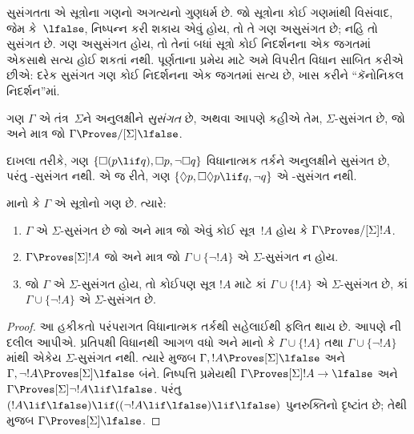 \begingroup
\makeatletter{}\makeatother


\label{guunit:OLP-0440}


સુસંગતતા એ સૂત્રોના ગણનો અગત્યનો ગુણધર્મ છે. જો સૂત્રોના કોઈ ગણમાંથી
વિસંવાદ, જેમ કે~$\lfalse$, નિષ્પન્ન કરી શકાય એવું હોય, તો તે ગણ અસુસંગત છે;
નહિ તો સુસંગત છે. ગણ અસુસંગત હોય, તો તેનાં બધાં સૂત્રો કોઈ
નિદર્શનના એક જગતમાં એકસાથે સત્ય હોઈ શકતાં નથી. પૂર્ણતાના પ્રમેય માટે
અમે વિપરીત વિધાન સાબિત કરીએ છીએ: દરેક સુસંગત ગણ કોઈ નિદર્શનના એક
જગતમાં સત્ય છે, ખાસ કરીને ``કૅનોનિકલ નિદર્શન''માં.

\begin{defn}
  ગણ $\Gamma$ એ તંત્ર~$\Sigma$ને અનુલક્ષીને \emph{સુસંગત} છે, અથવા
  આપણે કહીએ તેમ, $\Sigma$-સુસંગત છે, જો અને માત્ર જો $\Gamma
  \Proves/[\Sigma] \lfalse$.
\end{defn}

દાખલા તરીકે, ગણ $\{ \Box(p \lif q), \Box p, \lnot\Box q \}$
વિધાનાત્મક તર્કને અનુલક્ષીને સુસંગત છે, પરંતુ -સુસંગત નથી.
એ જ રીતે, ગણ $\{ \Diamond p, \Box\Diamond
p \lif q, \lnot q \}$ એ -સુસંગત નથી.

\begin{prop}
  માનો કે $\Gamma$ એ સૂત્રોનો ગણ છે. ત્યારે:
  \begin{enumerate}
  \item $\Gamma$ એ $\Sigma$-સુસંગત છે જો અને માત્ર જો એવું કોઈ
    સૂત્ર~$!A$ હોય કે $\Gamma \Proves/[\Sigma]
    !A$.
  \item {}%
    $\Gamma \Proves[\Sigma] !A$ જો અને માત્ર જો $\Gamma \cup \{
    \lnot!A \}$ એ $\Sigma$-સુસંગત ન હોય.
  \item {}%
    જો $\Gamma$ એ $\Sigma$-સુસંગત હોય, તો કોઈપણ સૂત્ર
    $!A$ માટે કાં $\Gamma \cup \{ !A \}$ એ $\Sigma$-સુસંગત છે,
    કાં $\Gamma \cup \{ \lnot!A \}$ એ $\Sigma$-સુસંગત છે.
  \end{enumerate}
\end{prop}

\begin{proof}
  આ હકીકતો પરંપરાગત વિધાનાત્મક તર્કથી સહેલાઈથી ફલિત થાય છે. આપણે
  ની દલીલ આપીએ. પ્રતિપક્ષી વિધાનથી
  આગળ વધો અને માનો કે $\Gamma \cup \{ !A \}$ તથા
  $\Gamma \cup \{ \lnot!A \}$માંથી એકેય $\Sigma$-સુસંગત નથી.
  ત્યારે  મુજબ $\Gamma, !A \Proves[\Sigma]
  \lfalse$ અને $\Gamma, \lnot !A \Proves[\Sigma] \lfalse$ બંને.
  નિષ્પત્તિ પ્રમેયથી $\Gamma \Proves[\Sigma] !A \to \lfalse$ અને
  $\Gamma \Proves[\Sigma] \lnot!A \lif \lfalse$. પરંતુ $(!A \lif
  \lfalse) \lif ((\lnot!A \lif \lfalse) \lif \lfalse)$ પુનરુક્તિનો
  દૃષ્ટાંત છે; તેથી
   મુજબ
  $\Gamma \Proves[\Sigma] \lfalse$.
\end{proof}
\endgroup



